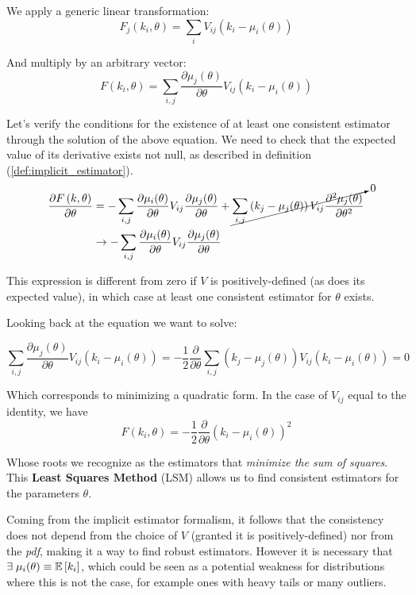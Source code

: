 We apply a generic linear transformation:
	\[
	F_j\left(k_i,\theta\right) = \sum_i V_{ij}\left(k_i - \mu_i(\theta)\right)
	\]

And multiply by an arbitrary vector:
	\[
	F\left(k_i,\theta\right) = \sum_{i,j} \frac{\partial \mu_j(\theta)}{\partial\theta}V_{ij}\left(k_i - \mu_i(\theta)\right)
	\]

Let's verify the conditions for the existence of at least one consistent estimator through the solution of the above equation. We need to check that the expected value of its derivative exists not null, as described in definition (\ref{def:implicit_estimator}).
\begin{align*}
	\frac{\partial F\left(k,\theta\right)}{\partial\theta} &= -\sum_{i,j}\frac{\partial \mu_i(\theta)}{\partial\theta}V_{ij}\frac{\partial \mu_j(\theta)}{\partial\theta} + \cancelto{0}{\sum_{i,j}\left(k_j - \mu_j(\theta)\right)V_{ij}\frac{\partial^2 \mu_j(\theta)}{\partial\theta^2}}\\
	&\rightarrow -\sum_{i,j}\frac{\partial \mu_i(\theta)}{\partial\theta}V_{ij}\frac{\partial \mu_j(\theta)}{\partial\theta}
\end{align*}

This expression is different from zero if $V$ is positively-defined (as does its expected value), in which case at least one consistent estimator for $\theta$ exists. 

Looking back at the equation we want to solve: 

	\[
	\sum_{i,j} \frac{\partial \mu_j(\theta)}{\partial\theta}V_{ij}\left(k_i - \mu_i(\theta)\right) = -\frac{1}{2}\frac{\partial}{\partial\theta}\sum_{i,j} \left(k_j - \mu_j(\theta)\right)V_{ij}\left(k_i - \mu_i(\theta)\right) = 0
	\]

Which corresponds to minimizing a quadratic form. In the case of $V_{ij}$ equal to the identity, we have
	\[
	F(k_i,\theta) = - \frac{1}{2}\frac{\partial}{\partial\theta}\left(k_i-\mu_i(\theta)\right)^2
	\]

Whose roots we recognize as the estimators that \emph{minimize the sum of squares}. This \textbf{Least Squares Method} (LSM) allows us to find consistent estimators for the parameters $\theta$. 

Coming from the implicit estimator formalism, it follows that the consistency does not depend from the choice of $V$ (granted it is positively-defined) nor from the \emph{pdf}, making it a way to find robust estimators. However it is necessary that $\exists\; \mu_i(\theta)\equiv \mathbb{E}\left[k_i\right]$, which could be seen as a potential weakness for distributions where this is not the case, for example ones with heavy tails or many outliers.

